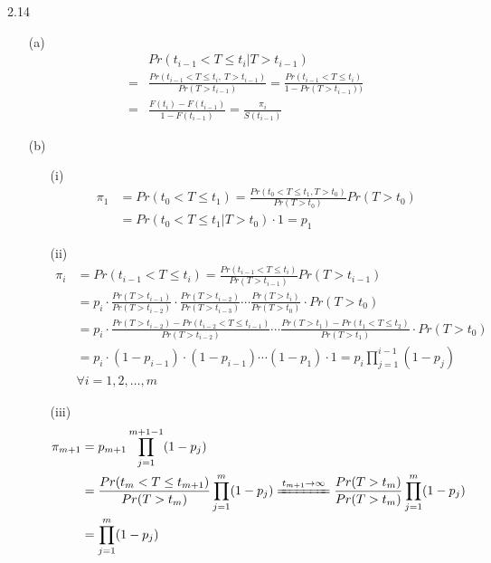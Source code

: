 \documentclass[paper=a4, fontsize=12pt]{scrartcl} %
\numberwithin{equation}{section} %
\numberwithin{figure}{section} %
\numberwithin{table}{section} %
\begin{document}
2.14
\begin{itemize}
	\item[(a)]{
		\begin{align*}
				&	Pr(t_{i-1} < T \leq t_i \vert T>t_{i-1})\\
			=	&	\frac{Pr(t_{i-1} < T \leq t_i ,\ T>t_{i-1})}{Pr(T>t_{i-1})}
			=		\frac{Pr(t_{i-1} < T \leq t_i)}{1-Pr(T>t_{i-1}))}\\
			=	&	\frac{F(t_i)-F(t_{i-1})}{1-F(t_{i-1})} = \frac{\pi_i}{S(t_{i-1})}
		\end{align*}
	}
	
	\item[(b)]{
		\begin{itemize}
			\item[(i)]{
				\begin{align*}
					\pi_1 	&=	Pr(t_0 < T \leq t_1) = \frac{Pr(t_0 < T \leq t_1, T>t_0)}{Pr(T>t_0)} Pr(T>t_0)\\
							&=	Pr(t_0 < T \leq t_1 \vert T>t_0)\cdot 1 = p_1
				\end{align*}
			}
			
			\item[(ii)]{
				\begin{align*}
					\pi_i 		&= 	Pr(t_{i-1} < T \leq t_i) = \frac{Pr(t_{i-1} < T \leq t_i)}{Pr(T>t_{i-1})}Pr(T>t_{i-1})\\
							&=	p_i \cdot  \frac{Pr(T>t_{i-1})}{Pr(T>t_{i-2})} \cdot \frac{Pr(T>t_{i-2})}{Pr(T>t_{i-3})} 
								\cdots \frac{Pr(T>t_{i})}{Pr(T>t_{0})} \cdot Pr(T>t_{0})\\
							&=	p_i \cdot \frac{Pr(T>t_{i-2})-Pr(t_{i-2}<T\leq t_{i-1})}{Pr(T>t_{i-2})} \cdots 
								\frac{Pr(T>t_{1})-Pr(t_{1}<T\leq t_{2})}{Pr(T>t_{1})}\cdot Pr(T>t_{0})\\
							&=	p_i\cdot (1-p_{i-1})\cdot (1-p_{i-1})\cdots(1-p_1) \cdot 1 
							  = 	p_i \prod_{j=1}^{i-1}(1-p_j) \\
							&	\forall i=1,2,\dots , m
				\end{align*}
			}
			
			\item[(iii)]{
				\begin{align*}
					\pi_{m+1}	&=	p_{m+1} \prod_{j=1}^{m+1-1}(1-p_j) \\
							&=	\frac{Pr(t_m<T\leq t_{m+1})}{Pr(T>t_m)}\prod_{j=1}^{m}(1-p_j)
							\xlongequal{t_{m+1} \rightarrow \infty}	\frac{Pr(T>t_m)}{Pr(T>t_m)}\prod_{j=1}^{m}(1-p_j)\\
							&=	\prod_{j=1}^{m}(1-p_j)\\
				\end{align*}
			}
		\end{itemize}
	}
	

\end{itemize}
\end{document}
